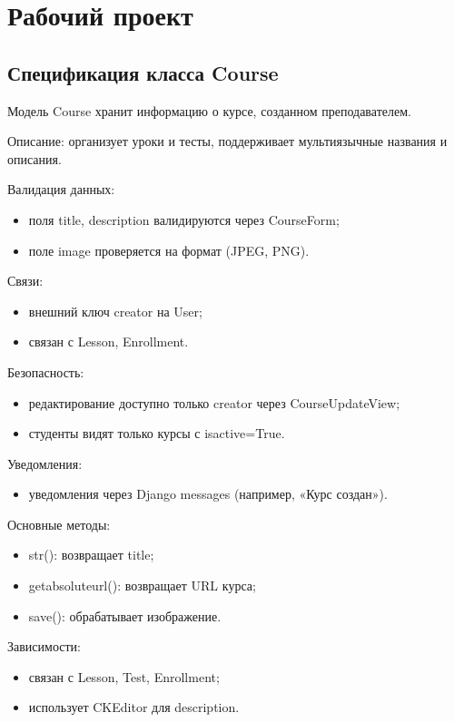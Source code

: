 \section{Рабочий проект}

\subsection{Спецификация класса Course}

Модель Course хранит информацию о курсе, созданном преподавателем.

Описание: организует уроки и тесты, поддерживает мультиязычные названия и описания.

Валидация данных:
	\begin{itemize}
		\item поля title, description валидируются через CourseForm;
		\item поле image проверяется на формат (JPEG, PNG).
	\end{itemize}
	
Связи:
	\begin{itemize}
		\item внешний ключ creator на User;
		\item связан с Lesson, Enrollment.
	\end{itemize}
		
Безопасность:
	\begin{itemize}
		\item редактирование доступно только creator через CourseUpdateView;
		\item студенты видят только курсы с isactive=True.
	\end{itemize}
	
Уведомления:
	\begin{itemize}
		\item уведомления через Django messages (например, «Курс создан»).
	\end{itemize}
	
Основные методы:
	\begin{itemize}
		\item str(): возвращает title;
		\item getabsoluteurl(): возвращает URL курса;
		\item save(): обрабатывает изображение.
	\end{itemize}
	
Зависимости:
	\begin{itemize}
		\item связан с Lesson, Test, Enrollment;
		\item использует CKEditor для description.
	\end{itemize}


